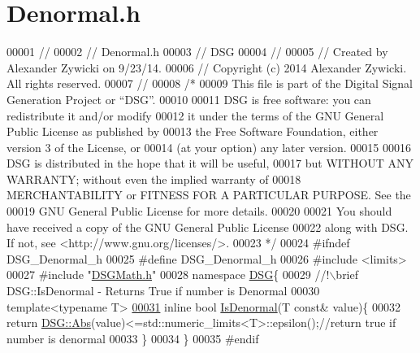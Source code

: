 \hypertarget{_denormal_8h_source}{\section{Denormal.\+h}
\label{_denormal_8h_source}
}

\begin{DoxyCode}
00001 \textcolor{comment}{//}
00002 \textcolor{comment}{//  Denormal.h}
00003 \textcolor{comment}{//  DSG}
00004 \textcolor{comment}{//}
00005 \textcolor{comment}{//  Created by Alexander Zywicki on 9/23/14.}
00006 \textcolor{comment}{//  Copyright (c) 2014 Alexander Zywicki. All rights reserved.}
00007 \textcolor{comment}{//}
00008 \textcolor{comment}{/*}
00009 \textcolor{comment}{ This file is part of the Digital Signal Generation Project or “DSG”.}
00010 \textcolor{comment}{}
00011 \textcolor{comment}{ DSG is free software: you can redistribute it and/or modify}
00012 \textcolor{comment}{ it under the terms of the GNU General Public License as published by}
00013 \textcolor{comment}{ the Free Software Foundation, either version 3 of the License, or}
00014 \textcolor{comment}{ (at your option) any later version.}
00015 \textcolor{comment}{}
00016 \textcolor{comment}{ DSG is distributed in the hope that it will be useful,}
00017 \textcolor{comment}{ but WITHOUT ANY WARRANTY; without even the implied warranty of}
00018 \textcolor{comment}{ MERCHANTABILITY or FITNESS FOR A PARTICULAR PURPOSE.  See the}
00019 \textcolor{comment}{ GNU General Public License for more details.}
00020 \textcolor{comment}{}
00021 \textcolor{comment}{ You should have received a copy of the GNU General Public License}
00022 \textcolor{comment}{ along with DSG.  If not, see <http://www.gnu.org/licenses/>.}
00023 \textcolor{comment}{ */}
00024 \textcolor{preprocessor}{#ifndef DSG\_Denormal\_h}
00025 \textcolor{preprocessor}{#define DSG\_Denormal\_h}
00026 \textcolor{preprocessor}{#include <limits>}
00027 \textcolor{preprocessor}{#include "\hyperlink{_d_s_g_math_8h}{DSGMath.h}"}
00028 \textcolor{keyword}{namespace }\hyperlink{namespace_d_s_g}{DSG}\{\textcolor{comment}{}
00029 \textcolor{comment}{    //!\(\backslash\)brief DSG::IsDenormal - Returns True if number is Denormal }
00030 \textcolor{comment}{}    \textcolor{keyword}{template}<\textcolor{keyword}{typename} T>
\hypertarget{_denormal_8h_source_l00031}{}\hyperlink{namespace_d_s_g_a9eee3c39a1f45d42f0b4fa7201d3ba3d}{00031}     \textcolor{keyword}{inline} \textcolor{keywordtype}{bool} \hyperlink{namespace_d_s_g_a9eee3c39a1f45d42f0b4fa7201d3ba3d}{IsDenormal}(T \textcolor{keyword}{const}& value)\{
00032         \textcolor{keywordflow}{return} \hyperlink{namespace_d_s_g_a0af03bade7e25e8da80e3022af0e45a7}{DSG::Abs}(value)<=std::numeric\_limits<T>::epsilon();\textcolor{comment}{//return true if number is
       denormal}
00033     \}
00034 \}
00035 \textcolor{preprocessor}{#endif}
\end{DoxyCode}
